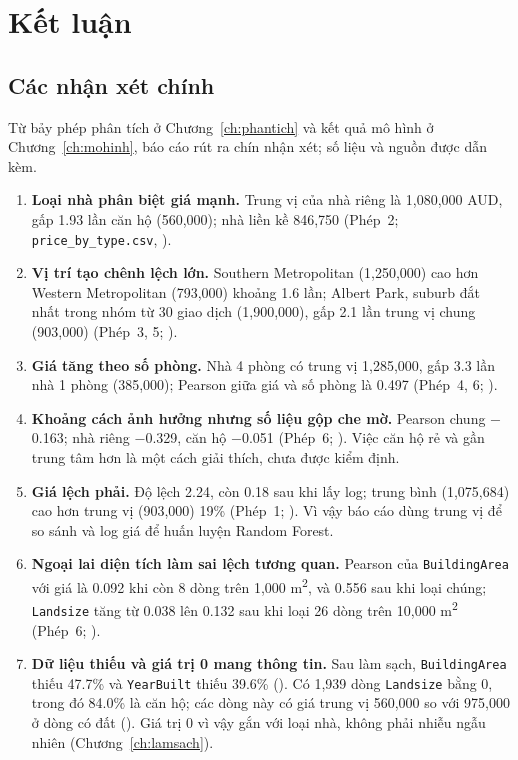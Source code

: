 \chapter{Kết luận}\label{ch:ketluan}

\section{Các nhận xét chính}\label{sec:nhanxet}
Từ bảy phép phân tích ở Chương~\ref{ch:phantich} và kết quả mô hình ở Chương~\ref{ch:mohinh}, báo cáo rút ra chín nhận xét; số liệu và nguồn được dẫn kèm.
\begin{enumerate}
  \item \textbf{Loại nhà phân biệt giá mạnh.} Trung vị của nhà riêng là 1,080,000 AUD, gấp 1.93 lần căn hộ (560,000); nhà liền kề 846,750 (Phép~2; \texttt{price\_by\_type.csv}, ).
  \item \textbf{Vị trí tạo chênh lệch lớn.} Southern Metropolitan (1,250,000) cao hơn Western Metropolitan (793,000) khoảng 1.6 lần; Albert Park, suburb đắt nhất trong nhóm từ 30 giao dịch (1,900,000), gấp 2.1 lần trung vị chung (903,000) (Phép~3, 5; ).
  \item \textbf{Giá tăng theo số phòng.} Nhà 4 phòng có trung vị 1,285,000, gấp 3.3 lần nhà 1 phòng (385,000); Pearson giữa giá và số phòng là 0.497 (Phép~4, 6; ).
  \item \textbf{Khoảng cách ảnh hưởng nhưng số liệu gộp che mờ.} Pearson chung $-$0.163; nhà riêng $-$0.329, căn hộ $-$0.051 (Phép~6; ). Việc căn hộ rẻ và gần trung tâm hơn là một cách giải thích, chưa được kiểm định.
  \item \textbf{Giá lệch phải.} Độ lệch 2.24, còn 0.18 sau khi lấy log; trung bình (1,075,684) cao hơn trung vị (903,000) 19\% (Phép~1; ). Vì vậy báo cáo dùng trung vị để so sánh và log giá để huấn luyện Random Forest.
  \item \textbf{Ngoại lai diện tích làm sai lệch tương quan.} Pearson của \texttt{BuildingArea} với giá là 0.092 khi còn 8 dòng trên 1,000 m\textsuperscript{2}, và 0.556 sau khi loại chúng; \texttt{Landsize} tăng từ 0.038 lên 0.132 sau khi loại 26 dòng trên 10,000 m\textsuperscript{2} (Phép~6; ).
  \item \textbf{Dữ liệu thiếu và giá trị 0 mang thông tin.} Sau làm sạch, \texttt{BuildingArea} thiếu 47.7\% và \texttt{YearBuilt} thiếu 39.6\% (). Có 1,939 dòng \texttt{Landsize} bằng 0, trong đó 84.0\% là căn hộ; các dòng này có giá trung vị 560,000 so với 975,000 ở dòng có đất (). Giá trị 0 vì vậy gắn với loại nhà, không phải nhiễu ngẫu nhiên (Chương~\ref{ch:lamsach}).

\end{enumerate}
